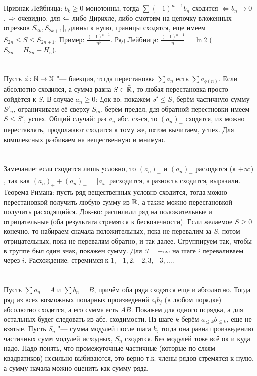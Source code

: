 \section{} %
Признак Лейбница: $b_k \ge 0$ монотонны, тогда $\sum (-1)^{n-1} b_n$ сходится $\iff b_n \to 0$.
$\Rightarrow$ очевидно, для $\Leftarrow$ либо Дирихле, либо смотрим на цепочку вложенных отрезков $S_{2k}, S_{2k+1}]$, длины к нулю, границы сходятся,
еще имеем $S_{2n} \le S \le S_{2n+1}$.
Пример: $\frac{(-1)^{n-1}}{n^p}$.
Ряд Лейбница: $\frac{(-1)^{n-1}}{n} = \ln 2$ ($S_{2n}=H_{2n}-H_n$).

\section{} %
Пусть $\phi \colon \mathbb{N} \to \mathbb{N}$ "--- биекция, тогда перестановка $\sum a_n$ есть $\sum a_{\phi(n)}$.
Если абсолютно сходился, а сумма равна $S \in \bar {\mathbb{R}}$, то любая перестановка просто сойдётся к $S$.
В случае $a_n \ge 0$: 
Док-во: покажем $S' \le S$, берём частичную сумму $S'_n$, ограничиваем её сверху $S_m$, берём предел,
для обратной перестновки имеем $S \le S'$, успех.
Общий случай: раз $a_n$ абс. сх-ся, то $(a_n)_{\pm}$ сходятся, их можно переставлять, продолжают сходится к тому же,
потом вычитаем, успех.
Для комплексных разбиваем на вещественную и мнимую.

\section{} %
Замечание: если сходится лишь условно, то $(a_n)_+$ и $(a_n)_-$ расходятся (к $+\infty)$,
так как $(a_n)_+ + (a_n)_- = |a_n|$ расходится, а разность сходится, выразили.
Теорема Римана: пусть ряд вещественных условно сходится, тогда можно перестановкой получить любую сумму из $\mathbb{R}$,
а также можно перестановкой получить расходящийся.
Док-во: распилили ряд на положительные и отрицательные (оба результата стремятся к бесконечности).
Если желаемое $S \ge 0$ конечно, то набираем сначала положительных, пока не перевалим за $S$, потом
отрицательных, пока не перевалим обратно, и так далее.
Сгруппируем так, чтобы в группе был один знак, покажем сумму.
Для $S=+\infty$ на шаге $i$ переваливаем через $i$.
Расхождение: стремимся к $1, -1, 2, -2, 3, -3, \dots$.

\section{} %
Пусть $\sum a_n = A$ и $\sum b_n = B$, причём оба ряда сходятся еще и абсолютно.
Тогда ряд из всех возможных попарных произведений $a_ib_j$ (в любом порядке) абсолютно сходится,
а его сумма есть $AB$.
Покажем для одного порядка, а для остальных будет следовать из абс. сходимости.
На шаге $k$ берём $a_{\le k}b_{\le k}$, еще не взятые.
Пусть $S_n$ "--- сумма модулей после шага $k$, тогда она равна произведению частичных сумм модулей исходных, $S_n$ сходятся.
Без модулей тоже всё ок и куда надо.
Надо понять, что промежуточные частичные (которые по слоям квадратиков) несильно выбиваются, это верно т.к. члены рядов стремятся к нулю,
а сумму начала можно оценить как сумму ряда.

